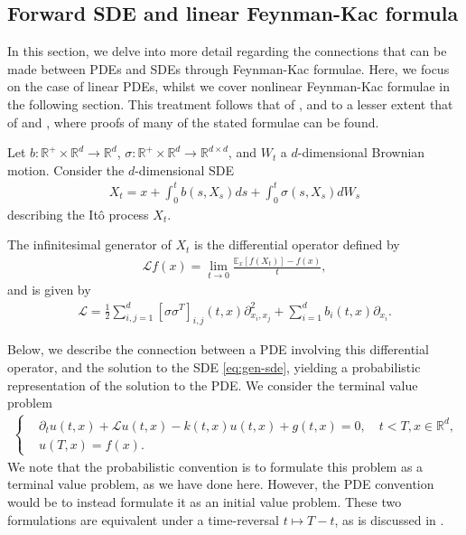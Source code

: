 \subsection{Forward SDE and linear Feynman-Kac formula}

In this section, we delve into more detail regarding the connections that can be made between PDEs and SDEs through Feynman-Kac formulae. Here, we focus on the case of linear PDEs, whilst we cover nonlinear Feynman-Kac formulae in the following section. This treatment follows that of \cite{gobet2016monte}, and to a lesser extent that of \cite{oksendal2003stochastic} and \cite{klebaner2012introduction}, where proofs of many of the stated formulae can be found. 

Let $b:\mathbb{R}^+ \times \mathbb{R}^d \rightarrow \mathbb{R}^d$, $\sigma:\mathbb{R}^+ \times \mathbb{R}^d \rightarrow \mathbb{R}^{d \times d}$, and $W_t$ a $d$-dimensional Brownian motion. Consider the $d$-dimensional SDE
%
\begin{align}
    \label{eq:gen-sde}
X_t = x + \int_0^t b(s,X_s) ds + \int_0^t \sigma(s,X_s)dW_s
\end{align}
%
describing the Itô process $X_t$. 

The infinitesimal generator of $X_t$ is the differential operator defined by 
%
\begin{align} 
    \mathcal{L}f(x) = \lim_{t\rightarrow 0} \frac{\mathbb{E}_x[f(X_t)]-f(x)}{t},
\end{align}
%
and is given by
%
\begin{align}
    \label{eq:generator-operator}
    \mathcal{L} = \frac{1}{2} \sum_{i,j=1}^d [\sigma \sigma^T]_{i,j}(t,x) \partial_{x_i,x_j}^2 + \sum_{i=1}^d b_i(t,x) \partial_{x_i}.
\end{align}
%

Below, we describe the connection between a PDE involving this differential operator, and the solution to the SDE \autoref{eq:gen-sde}, yielding a probabilistic representation of the solution to the PDE. We consider the terminal value problem
%
\begin{align}
    \label{eq:backward-pde}
    \begin{cases}
    &\partial_t u(t,x) + \mathcal{L}u(t,x) - k(t,x)u(t,x) + g(t,x) = 0, \quad t<T,x \in \mathbb{R}^d, \\
    &u(T,x) = f(x).
    \end{cases}
\end{align}
%
We note that the probabilistic convention is to formulate this problem as a terminal value problem, as we have done here. However, the PDE convention would be to instead formulate it as an initial value problem. These two formulations are equivalent under a time-reversal $t \mapsto T-t$, as is discussed in \cite{gobet2016monte}. 

